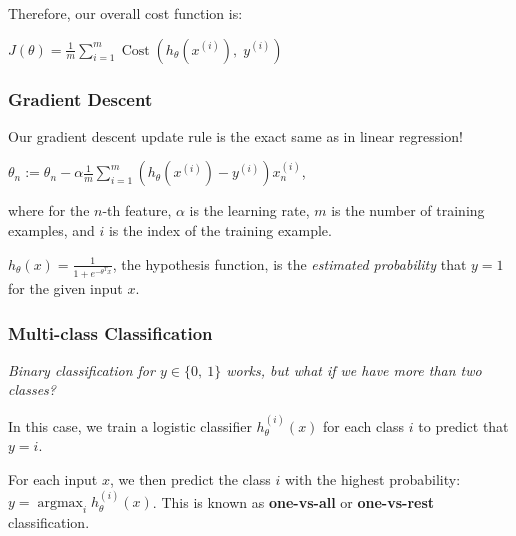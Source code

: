 Therefore, our overall cost function is:

$J(\theta) = \frac{1}{m} \sum_{i=1}^{m} \operatorname{Cost}\left(h_\theta(x^{(i)}), \; y^{(i)}\right)$

\subsubsection{Gradient Descent}
Our gradient descent update rule is the exact same as in linear regression!

$\theta_n := \theta_n - \alpha \frac{1}{m} \sum_{i=1}^{m} \left( h_\theta(x^{(i)}) - y^{(i)} \right) x_n^{(i)}$,

where for the $n$-th feature, $\alpha$ is the learning rate, $m$ is the number of training examples, and
$i$ is the index of the training example.

$h_\theta(x) = \frac{1}{1 + e^{-\theta^Tx}}$, the hypothesis function, is the \emph{estimated probability} that $y = 1$ for the given
input $x$.

\subsubsection{Multi-class Classification}
\emph{Binary classification for $y \in \{ 0, \: 1 \}$ works, but what if we have more than two classes?}

In this case, we train a logistic classifier $h_\theta^{(i)}(x)$ for each class $i$ to predict that $y = i$.

For each input $x$, we then predict the class $i$ with the highest probability:
$y = \operatorname{argmax}_i h_\theta^{(i)}(x)$.
This is known as \textbf{one-vs-all} or \textbf{one-vs-rest} classification.